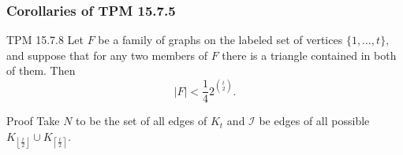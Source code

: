 \documentclass{beamer}
\newcommand{\lf}{\left\lfloor}
\newcommand{\rf}{\right\rfloor}
\newcommand{\lc}{\left\lceil}
\newcommand{\rc}{\right\rceil}
\begin{document}
\begin{frame}
  \frametitle{Corollaries of TPM 15.7.5}
  \begin{block}{TPM 15.7.8}
    Let $F$ be a family of graphs on the labeled set of vertices $\{ 1, \dotsc, t \}$, and suppose that for any two members of $F$ there is a triangle contained in both of them. Then \[ |F| < \frac{1}{4} 2^{\binom{t}{2}}. \]
  \end{block}

  \begin{block}{Proof}
    Take $N$ to be the set of all edges of $K_t$ and $\mathcal{I}$ be edges of all possible $K_{\lf \frac{t}{2} \rf} \cup K_{\lc \frac{t}{2} \rc}$.
  \end{block}
\end{frame}
\end{document}
